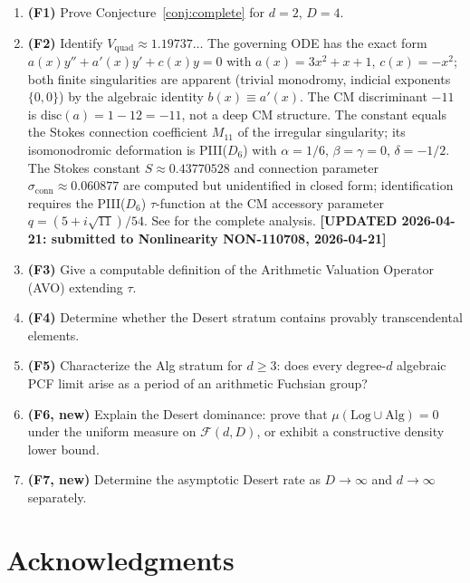 \documentclass[12pt]{amsart}
\newcommand{\UPDATED}[1]{{\color{teal}\textbf{[UPDATED 2026-04-21: #1]}}}
\begin{document}
\begin{enumerate}
\item \textbf{(F1)} Prove
  Conjecture~\ref{conj:complete} for $d=2$,
  $D=4$.

\item \textbf{(F2)} Identify
  $V_{\mathrm{quad}}\approx 1.19737\ldots$
  The governing ODE has the exact form
  $a(x)y''+a'(x)y'+c(x)y=0$ with
  $a(x)=3x^2+x+1$, $c(x)=-x^2$; both
  finite singularities are apparent
  (trivial monodromy, indicial exponents
  $\{0,0\}$) by the algebraic identity
  $b(x)\equiv a'(x)$. The CM discriminant
  $-11$ is $\mathrm{disc}(a)=1-12=-11$,
  not a deep CM structure. The constant
  equals the Stokes connection coefficient
  $M_{11}$ of the irregular singularity;
  its isomonodromic deformation is
  PIII($D_6$) with $\alpha=1/6$,
  $\beta=\gamma=0$, $\delta=-1/2$.
  The Stokes constant $S\approx 0.43770528$
  and connection parameter
  $\sigma_{\mathrm{conn}}\approx 0.060877$
  are computed but unidentified in closed
  form; identification requires the
  PIII($D_6$) $\tau$-function at the CM
  accessory parameter $q=(5+i\sqrt{11})/54$.
  See \cite{Vquad} for the complete analysis.
  \UPDATED{submitted to Nonlinearity
  NON-110708, 2026-04-21}

\item \textbf{(F3)} Give a computable
  definition of the Arithmetic Valuation
  Operator (AVO) extending $\tau$.

\item \textbf{(F4)} Determine whether the
  Desert stratum contains provably
  transcendental elements.

\item \textbf{(F5)} Characterize the Alg
  stratum for $d\geq 3$: does every
  degree-$d$ algebraic PCF limit arise as a
  period of an arithmetic Fuchsian group?

\item \textbf{(F6, new)} Explain the Desert
  dominance: prove that
  $\mu(\mathrm{Log}\cup\mathrm{Alg})=0$
  under the uniform measure on
  $\mathcal{F}(d,D)$, or exhibit a
  constructive density lower bound.

\item \textbf{(F7, new)} Determine the
  asymptotic Desert rate as $D\to\infty$
  and $d\to\infty$ separately.
\end{enumerate}

\section*{Acknowledgments}
\end{document}
